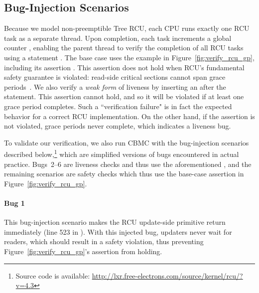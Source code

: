 \subsection{Bug-Injection Scenarios} \label{sec:bug_cases}
Because we model non-preemptible Tree RCU, each CPU runs exactly one RCU task
as a separate thread.
Upon completion, each task increments a global counter ,
enabling the parent thread to verify the completion of all RCU tasks
using a statement .
The base case uses the example in Figure~\ref{fig:verify_rcu_gp}, including
its assertion .
This assertion does not hold when
RCU's fundamental safety guarantee is violated:
read-side critical sections cannot span grace
periods~\cite{DesnoyersTPDS12UserRCU}.
%
We also verify a \emph{weak form} of liveness by inserting an  
after the  statement.
This assertion cannot hold, and so it will be violated if at least one grace period completes.
Such a ``verification failure" is in fact the expected behavior for a correct RCU implementation. 
On the other hand, if the assertion is not violated, grace periods never complete, which indicates a liveness bug.

To validate our verification, we also run CBMC with the bug-injection scenarios 
described below,\footnote{Source code is available: \url{http://lxr.free-electrons.com/source/kernel/rcu/?v=4.3}}
which are simplified versions of bugs encountered in actual practice.
Bugs~2--6 are liveness checks and thus use the
aforementioned , and the remaining scenarios are
safety checks which thus use the base-case assertion in
Figure~\ref{fig:verify_rcu_gp}.

\paragraph*{Bug 1}
This bug-injection scenario makes
the RCU update-side primitive  return immediately 
(line 523 in ).
With this injected bug, updaters never wait for readers, which should
result in a safety violation, thus preventing
Figure~\ref{fig:verify_rcu_gp}'s assertion from holding.


